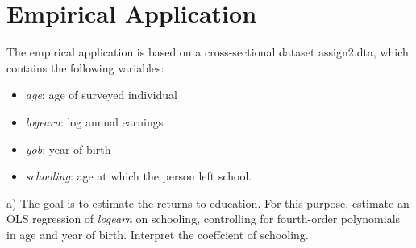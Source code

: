 \documentclass[a4paper,12pt,oneside,English]{article}
\begin{document}
\newpage
\section{Empirical Application}

The empirical application is based on a cross-sectional dataset assign2.dta, which contains the following variables:
\begin{itemize}
    \item \textit{age}: age of surveyed individual
    \item \textit{logearn}: log annual earnings
    \item \textit{yob}: year of birth
    \item \textit{schooling}: age at which the person left school.
\end{itemize}
a) The goal is to estimate the returns to education. For this purpose, estimate an OLS regression of \textit{logearn} on schooling, controlling for fourth-order polynomials in age and year of birth. Interpret the coeffcient of schooling.\\
\end{document}
